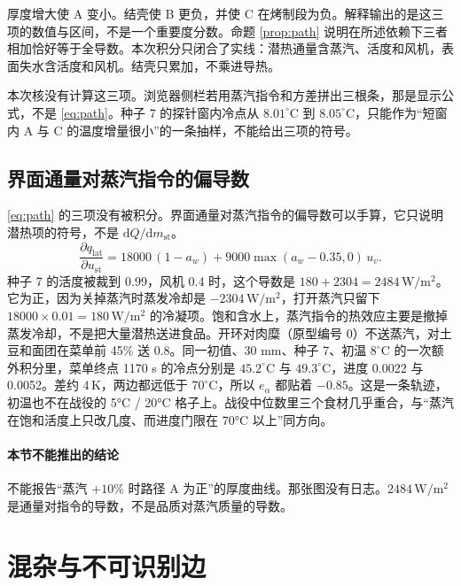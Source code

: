 厚度增大使 A 变小。结壳使 B 更负，并使 C 在烤制段为负。解释输出的是这三项的数值与区间，不是一个重要度分数。命题 \ref{prop:path} 说明在所述依赖下三者相加恰好等于全导数。本次积分只闭合了实线：潜热通量含蒸汽、活度和风机，表面失水含活度和风机。结壳只累加，不乘进导热。

本次核没有计算这三项。浏览器侧栏若用蒸汽指令和方差拼出三根条，那是显示公式，不是 \eqref{eq:path}。种子 7 的探针窗内冷点从 \(8.01^\circ\mathrm{C}\) 到 \(8.05^\circ\mathrm{C}\)，只能作为“短窗内 A 与 C 的温度增量很小”的一条抽样，不能给出三项的符号。

\subsection{界面通量对蒸汽指令的偏导数}

\eqref{eq:path} 的三项没有被积分。界面通量对蒸汽指令的偏导数可以手算，它只说明潜热项的符号，不是 \(\mathrm{d}Q/\mathrm{d}m_{\mathrm{st}}\)。
\begin{equation}
\label{eq:dqlat}
\frac{\partial q_{\mathrm{lat}}}{\partial u_{\mathrm{st}}}
=18000\,(1-a_w)+9000\max(a_w-0.35,0)\,u_v.
\end{equation}
种子 7 的活度被裁到 0.99，风机 0.4 时，这个导数是 \(180+2304=2484\,\mathrm{W}/\mathrm{m}^2\)。它为正，因为关掉蒸汽时蒸发冷却是 \(-2304\,\mathrm{W}/\mathrm{m}^2\)，打开蒸汽只留下 \(18000\times 0.01=180\,\mathrm{W}/\mathrm{m}^2\) 的冷凝项。饱和含水上，蒸汽指令的热效应主要是撤掉蒸发冷却，不是把大量潜热送进食品。开环对肉糜（原型编号 0）不送蒸汽，对土豆和面团在菜单前 45\% 送 0.8。同一初值、30 mm、种子 7、初温 \(8^\circ\mathrm{C}\) 的一次额外积分里，菜单终点 1170 s 的冷点分别是 \(45.2^\circ\mathrm{C}\) 与 \(49.3^\circ\mathrm{C}\)，进度 0.0022 与 0.0052。差约 \(4\,\mathrm{K}\)，两边都远低于 \(70^\circ\mathrm{C}\)，所以 \(e_{\alpha}\) 都贴着 \(-0.85\)。这是一条轨迹，初温也不在战役的 5°C / 20°C 格子上。战役中位数里三个食材几乎重合，与“蒸汽在饱和活度上只改几度、而进度门限在 70°C 以上”同方向。

\paragraph{本节不能推出的结论}
不能报告“蒸汽 \(+10\%\) 时路径 A 为正”的厚度曲线。那张图没有日志。\(2484\,\mathrm{W}/\mathrm{m}^2\) 是通量对指令的导数，不是品质对蒸汽质量的导数。

\section{混杂与不可识别边}

